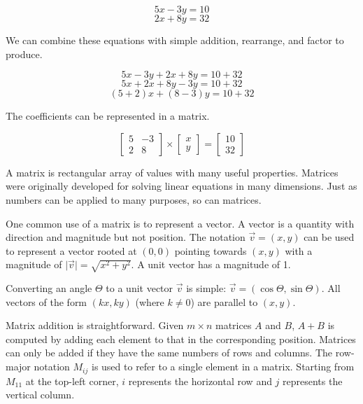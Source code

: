 \documentclass{book}
\begin{document}
\begin{equation*}5x-3y=10\end{equation*}
\begin{equation*}2x+8y=32\end{equation*}

We can combine these equations with simple addition, rearrange, and factor to produce.

\begin{equation*}5x-3y + 2x+8y = 10 + 32\end{equation*}
\begin{equation*}5x + 2x+8y -3y= 10 + 32\end{equation*}
\begin{equation*}(5 + 2)x + (8 -3)y= 10 + 32\end{equation*}

The coefficients can be represented in a matrix.

\begin{equation*}
\begin{bmatrix}
5 & -3 \\
2 & 8
\end{bmatrix} \times 
\begin{bmatrix}x \\ y\end{bmatrix} = 
\begin{bmatrix}10 \\ 32\end{bmatrix}
\end{equation*}

A matrix is rectangular array of values with many useful properties. Matrices were originally developed for solving linear equations in many dimensions. Just as numbers can be applied to many purposes, so can matrices.

One common use of a matrix is to represent a vector. A vector is a quantity with direction and magnitude but not position. The notation $\vec{v}=(x,y)$ can be used to represent a vector rooted at $(0,0)$ pointing towards $(x,y)$ with a magnitude of $\lvert\vec{v}\rvert=\sqrt{x^2 + y^2}$. A unit vector has a magnitude of 1.

Converting an angle $\Theta$ to a unit vector $\vec{v}$ is simple: $\vec{v}=(\cos{\Theta},\sin{\Theta})$. All vectors of the form $(k x, k y)$ (where $k \ne 0$) are parallel to $(x,y)$.

Matrix addition is straightforward. Given $m \times n$ matrices $A$ and $B$, $A+B$ is computed by adding each element to that in the corresponding position. Matrices can only be added if they have the same numbers of rows and columns. The row-major notation $M_{ij}$ is used to refer to a single element in a matrix. Starting from $M_{11}$ at the top-left corner, $i$ represents the horizontal row and $j$ represents the vertical column.
\end{document}
